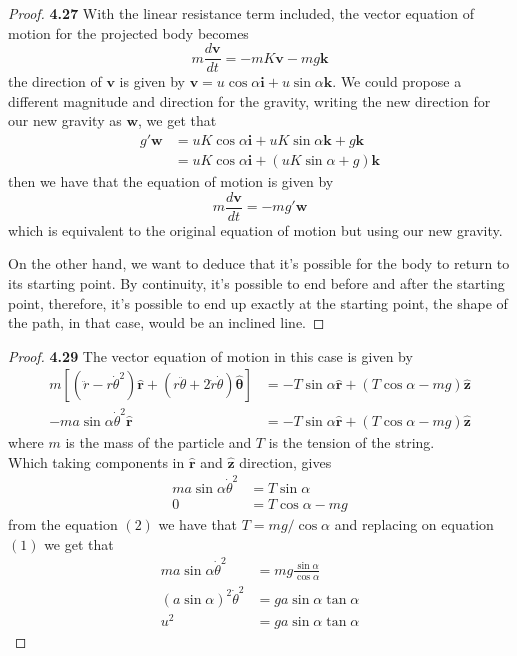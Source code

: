 \documentclass[11pt]{article}
\newcommand{\hatr}{\bm{\hat{r}}}
\newcommand{\hatz}{\bm{\hat{z}}}
\newcommand{\hatth}{\bm{\hat{\theta}}}
\theoremstyle{definition}
\begin{document}
\cleardoublepage
    \begin{proof}{\textbf{4.27}}
        With the linear resistance term included, the vector equation of motion
        for the projected body becomes
        $$m\frac{d\bm{v}}{dt} = - mK\bm{v} - mg \bm{k}$$
        the direction of $\bm{v}$ is given by
        $\bm{v} = u\cos\alpha\bm{i} + u\sin\alpha\bm{k}$. We could propose
        a different magnitude and direction for the gravity, writing the new
        direction for our new gravity as $\bm{w}$, we get that
        \begin{align*}
            g'\bm{w} &= uK\cos\alpha\bm{i} + uK\sin\alpha\bm{k} + g\bm{k}\\
                   &= uK\cos\alpha\bm{i} + (uK\sin\alpha + g)\bm{k}
        \end{align*}
        then we have that the equation of motion is given by
        $$m\frac{d\bm{v}}{dt} = -mg'\bm{w}$$
        which is equivalent to the original equation of motion but using our
        new gravity.

        On the other hand, we want to deduce that it's possible for the body to
        return to its starting point. By continuity, it's possible to end
        before and after the starting point, therefore, it's possible to end up
        exactly at the starting point, the shape of the path, in that case,
        would be an inclined line. 
    \end{proof}
    \begin{proof}{\textbf{4.29}}
        The vector equation of motion in this case is given by
        \begin{align*}
            m[(\ddot{r} - r\dot{\theta}^2)\hatr + (r\ddot{\theta} + 2\dot{r}\dot{\theta})\hatth]
                &= -T\sin{\alpha}\hatr + (T\cos{\alpha} - mg)\hatz\\
            -ma\sin\alpha\dot{\theta}^2\hatr &= -T\sin{\alpha}\hatr + (T\cos{\alpha} - mg)\hatz
        \end{align*}
        where $m$ is the mass of the particle and $T$ is the tension of the
        string.\\
        Which taking components in $\hatr$ and $\hatz$ direction, gives
        \setcounter{equation}{0}%
        \begin{align}
            ma\sin\alpha\dot{\theta}^2 &= T\sin\alpha\\
            0 &= T\cos\alpha - mg
        \end{align}
        from the equation $(2)$ we have that $T = mg/\cos\alpha$ and replacing
        on equation $(1)$ we get that
        \begin{align*}
            ma\sin\alpha\dot{\theta}^2 &= mg\frac{\sin\alpha}{\cos\alpha}\\
            (a\sin\alpha)^2\dot{\theta}^2 &= ga\sin\alpha\tan\alpha\\
            u^2 &= ga\sin\alpha\tan\alpha
        \end{align*}        
    \end{proof}
\end{document}

